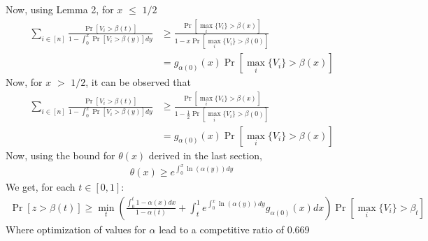 \documentclass[10pt, letterpaper, twoside]{article}
\begin{document}
	Now, using Lemma 2, for $x$ $\leq$ $1/2$
	\begin{align*}
		\sum_{i \in [n]} \frac{\Pr[V_{i} > \beta(t)]}{1 - \int_{0}^{x} \Pr[V_{i} > \beta(y)] dy} &\geq \frac{\Pr[\max_{i} \{V_{i}\} > \beta(x)]}{1-x\Pr[\max_{i} \{V_{i}\} > \beta(0)]}\\
		&= g_{\alpha(0)} (x) \Pr[\max_{i} \{V_{i}\} > \beta(x)]
	\end{align*}
	Now, for $x$ $>$ $1/2$, it can be observed that \\
	\begin{align*}
		\sum_{i \in [n]} \frac{\Pr[V_{i} > \beta(t)]}{1 - \int_{0}^{x} \Pr[V_{i} > \beta(y)] dy} &\geq \frac{\Pr[\max_{i} \{V_{i}\} > \beta(x)]}{1-\frac{1}{2}\Pr[\max_{i} \{V_{i}\} > \beta(0)]} \\
		&= g_{\alpha(0)} (x) \Pr[\max_{i} \{V_{i}\} > \beta(x)]
	\end{align*}
	Now, using the bound for $\theta(x)$ derived in the last section,
	\begin{align*}
		\theta(x) \geq e^{\int_{0}^{x} \ln(\alpha(y)) dy}
	\end{align*}
	We get, for each $t \in [0,1]$:
	\begin{align*}
		\Pr[z > \beta(t)] \geq \min_{t}\left(\frac{\int_{0}^{t} 1 - \alpha(x) dx}{1-\alpha(t)} + \int_{t}^{1} e^{\int_{0}^{x} \ln(\alpha(y)) dy} g_{\alpha(0)}(x) dx \right) \Pr[\max_{i} \{V_{i}\} > \beta_{t}]
	\end{align*}
	Where optimization of values for $\alpha$ lead to a competitive ratio of 0.669
\end{document}
